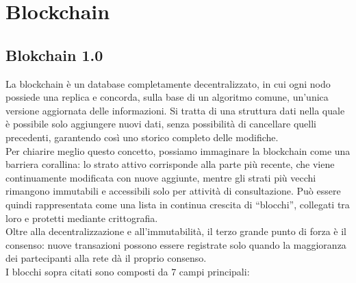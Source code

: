\chapter{Blockchain}
\section{Blokchain 1.0}
La blockchain è un database completamente decentralizzato, in cui ogni nodo possiede una replica e concorda, sulla base di un algoritmo comune, un’unica versione aggiornata delle informazioni. Si tratta di una struttura dati nella quale è possibile solo aggiungere nuovi dati, senza possibilità di cancellare quelli precedenti, garantendo così uno storico completo delle modifiche.
\\Per chiarire meglio questo concetto, possiamo immaginare la blockchain come una barriera corallina: lo strato attivo corrisponde alla parte più recente, che viene continuamente modificata con nuove aggiunte, mentre gli strati più vecchi rimangono immutabili e accessibili solo per attività di consultazione.
Può essere quindi rappresentata come una lista in continua crescita di “blocchi”, collegati tra loro e protetti mediante crittografia. 
\\Oltre alla decentralizzazione e all’immutabilità, il terzo grande punto di forza è il consenso: nuove transazioni possono essere registrate solo quando la maggioranza dei partecipanti alla rete dà il proprio consenso.
\\I blocchi sopra citati sono composti da 7 campi principali: 
